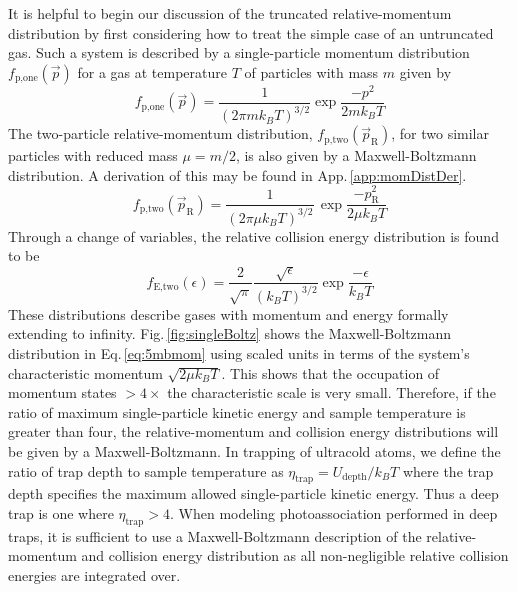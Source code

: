 It is helpful to begin our discussion of the truncated relative-momentum distribution by first considering how to treat the simple case of an untruncated gas.
Such a system is described by a single-particle momentum distribution $f_\text{p,one}(\vec{p})$ for a gas at temperature $T$ of particles with mass $m$ given by 
\begin{equation}  \label{eq:5single_particle_prob}
		 f_\text{p,one}( \vec{p} ) = \frac{1}{(2 \pi m k_B T)^{3/2}} \exp{\frac{-p^2}{2 m k_B T}}
\end{equation}
The two-particle relative-momentum distribution, $f_\text{p,two}(\vec{p}_\text{R})$, for two similar particles with reduced mass $\mu = m/2$, is also given by a Maxwell-Boltzmann distribution.
A derivation of this may be found in App.\,\ref{app:momDistDer}.
\begin{equation} \label{eq:5mbmom}
	 f_\text{p,two}( \vec{p}_\text{R} ) = \frac{1}{\left( 2 \pi \mu k_B T \right)^{3/2}}\,\exp{\frac{-p_\text{R}^2}{2 \mu k_B T}}
\end{equation}
Through a change of variables, the relative collision energy distribution is found to be
\begin{equation} \label{eq:5mben}
	 f_\text{E,two}( \epsilon ) = \frac{2}{\sqrt{\pi}} \frac{\sqrt{\epsilon}}{(k_B T)^{3/2}} \exp{\frac{-\epsilon}{k_B T}}
\end{equation}
These distributions describe gases with momentum and energy formally extending to infinity.
Fig.\,\ref{fig:singleBoltz} shows the Maxwell-Boltzmann distribution in Eq.\,\ref{eq:5mbmom} using scaled units in terms of the system's characteristic momentum $\sqrt{2 \mu k_B T}$.
This shows that the occupation of momentum states $>\!4\!\times$ the characteristic scale is very small.
Therefore, if the ratio of maximum single-particle kinetic energy and sample temperature is greater than four, the relative-momentum and collision energy distributions will be given by a Maxwell-Boltzmann.
In trapping of ultracold atoms, we define the ratio of trap depth to sample temperature as $\eta_\text{trap} = U_\text{depth}/k_B T$ where the trap depth specifies the maximum allowed single-particle kinetic energy.
Thus a deep trap is one where $\eta_\text{trap} > 4$.
When modeling photoassociation performed in deep traps, it is sufficient to use a Maxwell-Boltzmann description of the relative-momentum and collision energy distribution as all non-negligible relative collision energies are integrated over.

